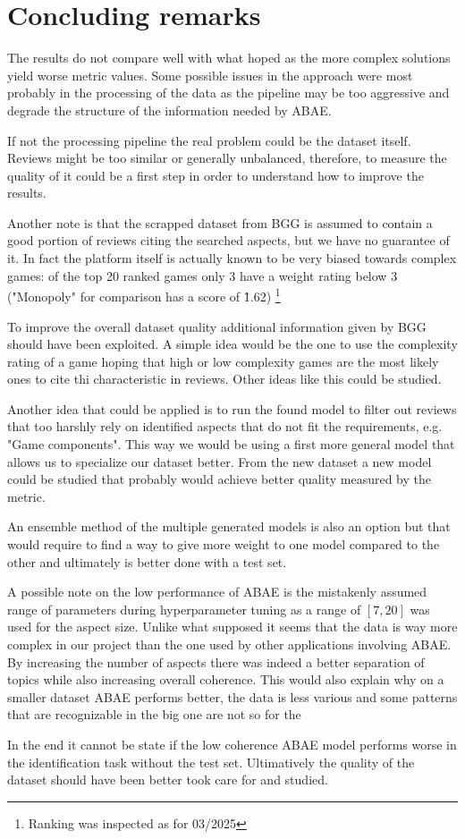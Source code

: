\section{Concluding remarks}
The results do not compare well with what hoped as the more complex solutions yield worse metric values.
Some possible issues in the approach were most probably in the processing of the data as the pipeline may be
too aggressive and degrade the structure of the information needed by ABAE.

If not the processing pipeline the real problem could be the dataset itself.
Reviews might be too similar or generally unbalanced, therefore, to measure the quality of it could
be a first step in order to understand how to improve the results.

Another note is that the scrapped dataset from BGG is assumed to contain a good portion of reviews citing
the searched aspects, but we have no guarantee of it.
In fact the platform itself is actually known to be very biased towards complex games: of the top 20 ranked
games only 3 have a weight rating below 3 ("Monopoly" for comparison has a score of \~1.62)
\footnote{Ranking was inspected as for 03/2025}

To improve the overall dataset quality additional information given by BGG should have been exploited.
A simple idea would be the one to use the complexity rating of a game hoping that high or low complexity games
are the most likely ones to cite thi characteristic in reviews.
Other ideas like this could be studied.

Another idea that could be applied is to run the found model to filter out reviews that too harshly rely
on identified aspects that do not fit the requirements, e.g. "Game components".
This way we would be using a first more general model that allows us to specialize our dataset better.
From the new dataset a new model could be studied that probably would achieve better quality measured by the metric.

An ensemble method of the multiple generated models is also an option but that would require to find a way to give more
weight to one model compared to the other and ultimately is better done with a test set.

A possible note on the low performance of ABAE is the mistakenly assumed range of parameters
during hyperparameter tuning as a range of $[7,20]$ was used for the aspect size.
Unlike what supposed it seems that the data is way more complex in our project than the one
used by other applications involving ABAE. By increasing the number of aspects there was indeed
a better separation of topics while also increasing overall coherence.
This would also explain why on a smaller dataset ABAE performs better, the data is less various
and some patterns that are recognizable in the big one are not so for the

In the end it cannot be state if the low coherence ABAE model performs worse in the identification task
without the test set.
Ultimatively the quality of the dataset should have been better took care for and studied.

